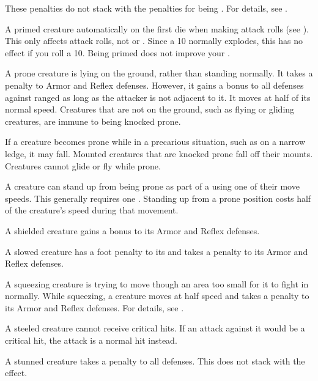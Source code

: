   These penalties do not stack with the penalties for being \unaware.
  For details, see .

   A primed creature automatically  on the first die when making attack rolls (see ).
  This only affects attack rolls, not  or .
  Since a 10 normally explodes, this has no effect if you roll a 10.
  Being primed does not improve your .

   A prone creature is lying on the ground, rather than standing normally.
  It takes a  penalty to Armor and Reflex defenses.
  However, it gains a  bonus to all defenses against ranged  as long as the attacker is not adjacent to it.
  It moves at half of its normal speed.
  Creatures that are not on the ground, such as flying or gliding creatures, are immune to being knocked prone.

  If a creature becomes prone while in a precarious situation, such as on a narrow ledge, it may fall.
  Mounted creatures that are knocked prone fall off their mounts.
  Creatures cannot glide or fly while prone.

  A creature can stand up from being prone as part of a  using one of their move speeds.
  This generally requires one .
  Standing up from a prone position costs half of the creature's speed during that movement.

   A shielded creature gains a  bonus to its Armor and Reflex defenses.

   A slowed creature has a  foot penalty to its  and takes a  penalty to its Armor and Reflex defenses.

   A squeezing creature is trying to move though an area too small for it to fight in normally.
  While squeezing, a creature moves at half speed and takes a  penalty to its Armor and Reflex defenses.
  For details, see .

   A steeled creature cannot receive critical hits.
  If an attack against it would be a critical hit, the attack is a normal hit instead.

   A stunned creature takes a  penalty to all defenses.
  This does not stack with the \confused effect.


